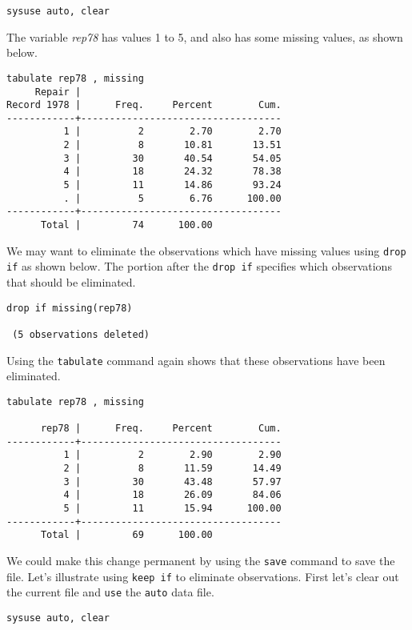 \begin{lstlisting}
sysuse auto, clear
\end{lstlisting}

The variable \textit{rep78} has values 1 to 5, and also has some missing values, as shown below.

\begin{lstlisting}
tabulate rep78 , missing
     Repair |
Record 1978 |      Freq.     Percent        Cum.
------------+-----------------------------------
          1 |          2        2.70        2.70
          2 |          8       10.81       13.51
          3 |         30       40.54       54.05
          4 |         18       24.32       78.38
          5 |         11       14.86       93.24
          . |          5        6.76      100.00
------------+-----------------------------------
      Total |         74      100.00
\end{lstlisting}

We may want to eliminate the observations which have missing values using \lstinline{drop if} as shown below. The portion after the \lstinline{drop if} specifies which observations that should be eliminated.

\begin{lstlisting}
drop if missing(rep78)

 (5 observations deleted)
\end{lstlisting}

Using the \lstinline{tabulate} command again shows that these observations have been eliminated.

\begin{lstlisting}
tabulate rep78 , missing

      rep78 |      Freq.     Percent        Cum.
------------+-----------------------------------
          1 |          2        2.90        2.90
          2 |          8       11.59       14.49
          3 |         30       43.48       57.97
          4 |         18       26.09       84.06
          5 |         11       15.94      100.00
------------+-----------------------------------
      Total |         69      100.00
\end{lstlisting}

We could make this change permanent by using the \lstinline{save} command to save the file. Let's illustrate using \lstinline{keep if} to eliminate observations. First let's clear out the current file and \lstinline{use} the \lstinline{auto} data file.

\begin{lstlisting}
sysuse auto, clear
\end{lstlisting}

